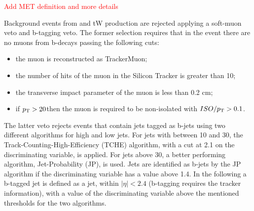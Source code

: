 \textcolor{red}{Add MET definition and more details}

Background events from \ttbar and tW production are rejected applying a soft-muon veto and b-tagging veto. The former selection requires that in the event there are no muons from b-decays passing the following cuts: 
\begin{itemize}
\item the muon is reconstructed as TrackerMuon;
\item the number of hits of the muon in the Silicon Tracker is greater than 10;
\item the transverse impact parameter of the muon is less than 0.2 cm;
\item if $p_\mathrm{T} > 20$\GeV then the muon is required to be non-isolated with $ISO/p_\mathrm{T} > 0.1$.
\end{itemize}

The latter veto rejects events that contain jets tagged as b-jets using two different algorithms for high and low \pt jets. For jets with \pt between 10 and 30\GeV, the Track-Counting-High-Efficiency (TCHE) algorithm, with a cut at 2.1 on the discriminating variable, is applied.
For jets above 30\GeV, a better performing algorithm, Jet-Probability (JP), is used. Jets are identified as b-jets by the JP algorithm if the discriminating variable has a value above 1.4.
In the following a b-tagged jet is defined as a jet, within $|\eta|<2.4$ (b-tagging requires the tracker information), with a value of the discriminating variable above the mentioned thresholds for the two algorithms.  


